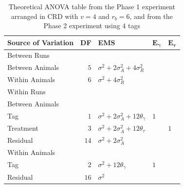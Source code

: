 \documentclass[12pt,a4paper]{article}
\begin{document}
\begin{table}[ht]
\centering
 \caption{Theoretical ANOVA table from the Phase 1 experiment arranged in CRD with $v = 4$ and $r_b = 6$, and from the Phase 2 experiment using 4 tags}
 \begin{tabular}[t]{lrlll} 
 \toprule 
 \multicolumn{1}{l}{\textbf{Source of Variation}} & \multicolumn{1}{l}{\textbf{DF}} & \multicolumn{1}{l}{\textbf{EMS}}& \multicolumn{1}{l}{$\bm{E_{\gamma}}$}&\multicolumn{1}{l}{$\bm{E_{\tau}}$}\\ 
 \midrule 
 Between Runs &  &  & & \\ 
 \quad Between Animals & $5$ & $\sigma^2+2\sigma_{A}^2+4\sigma_{R}^2$ & & \\  \quad Within Animals & $6$ & $\sigma^2+4\sigma_{R}^2$ & & \\ \hline 
 Within Runs &  &  & & \\ 
 \quad Between Animals &  &  & & \\ 
 \quad \quad Tag & $1$ & $\sigma^2+2\sigma_{A}^2+12\theta_{\gamma}$ &$1$ & \\ 
 \quad \quad Treatment & $3$ & $\sigma^2+2\sigma_{A}^2+12\theta_{\tau}$ & & $1$\\ 
 \quad \quad Residual & $14$ & $\sigma^2+2\sigma_{A}^2$ & & \\ \hline 
 \quad Within Animals &  &  & & \\ 
 \quad \quad Tag & $2$ & $\sigma^2+12\theta_{\gamma}$ &$1$ & \\ 
 \quad \quad Residual & $16$ & $\sigma^2$ & & \\ 
 \bottomrule 
 \end{tabular} 
 \label{tab:ANOVAPhase1CRD21} 
\end{table} 
\end{document}
